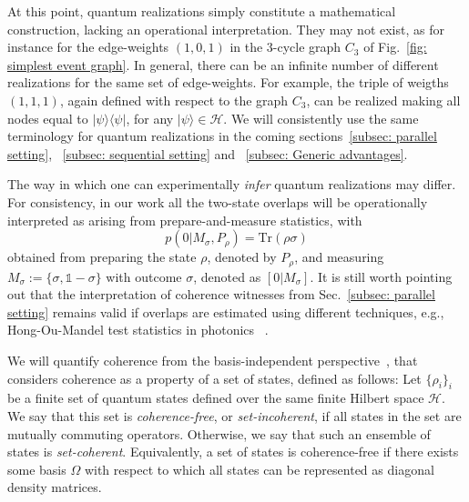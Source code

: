 \documentclass[a4paper,twocolumn,11pt,accepted=2024-01-17]{quantumarticle}
\begin{document}
{At this point, quantum realizations simply constitute a mathematical construction, lacking an operational interpretation. They may not exist, as for instance for the edge-weights $(1,0,1)$ in the $3$-cycle graph $C_3$ of Fig.~\ref{fig: simplest event graph}. In general, there can be an infinite number of different realizations for the same set of edge-weights. For example, the triple of weigths $(1,1,1)$, again defined with respect to the graph $C_3$, can be realized making all  nodes equal to $\vert \psi \rangle \langle \psi \vert $, for any $\vert \psi \rangle \in \mathcal{H}$. We will consistently use the same terminology for quantum realizations in the coming sections~\ref{subsec: parallel setting}, ~\ref{subsec: sequential setting} and ~\ref{subsec: Generic advantages}.

The way in which one can experimentally \textit{infer} quantum realizations may differ. For consistency, in our work all the two-state overlaps will be operationally interpreted as arising from prepare-and-measure statistics, with 
\begin{equation*}
p(0|M_\sigma,P_\rho) = \text{Tr}(\rho \sigma)
\end{equation*} obtained from preparing the state $\rho$, denoted by $P_\rho$, and measuring $M_\sigma := \{\sigma, \mathbb{1}-\sigma\}$ with outcome $\sigma$, denoted as $[0|M_\sigma]$. It is still worth pointing out that the interpretation of coherence witnesses from Sec.~\ref{subsec: parallel setting} remains valid if overlaps are estimated using different techniques, e.g., Hong-Ou-Mandel test statistics in photonics ~\cite{giordani2021witnessesofcoherence}.}

{We will quantify coherence from the basis-independent perspective~\cite{designolle2021set,galvaobroad2020quantumandclassical}, that considers coherence as a property of a set of states, defined as follows: Let $\{\rho_i\}_i$ be a finite set of quantum states defined over the same finite Hilbert space $\mathcal{H}$. We say that this set is \textit{coherence-free}, or \textit{set-incoherent}, if all states in the set are mutually commuting operators. Otherwise, we say that such an ensemble of states is \textit{set-coherent}. Equivalently, a set of states is coherence-free if there exists some basis $\Omega$ with respect to which all states can be represented as diagonal density matrices.
}
\end{document}
